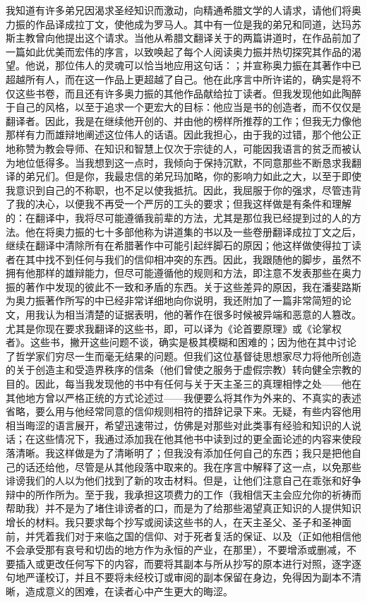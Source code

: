 我知道有许多弟兄因渴求圣经知识而激动，向精通希腊文学的人请求，请他们将奥力振的作品译成拉丁文，使他成为罗马人。其中有一位是我的弟兄和同道，达玛苏斯主教曾向他提出这个请求。当他从希腊文翻译关于的两篇讲道时，在作品前加了一篇如此优美而宏伟的序言，以致唤起了每个人阅读奥力振并热切探究其作品的渴望。他说，那位伟人的灵魂可以恰当地应用这句话：；并宣称奥力振在其著作中已超越所有人，而在这一作品上更超越了自己。他在此序言中所许诺的，确实是将不仅这些书卷，而且还有许多奥力振的其他作品献给拉丁读者。但我发现他如此陶醉于自己的风格，以至于追求一个更宏大的目标：他应当是书的创造者，而不仅仅是翻译者。因此，我是在继续他开创的、并由他的榜样所推荐的工作；但我无力像他那样有力而雄辩地阐述这位伟人的话语。因此我担心，由于我的过错，那个他公正地称赞为教会导师、在知识和智慧上仅次于宗徒的人，可能因我语言的贫乏而被认为地位低得多。当我想到这一点时，我倾向于保持沉默，不同意那些不断恳求我翻译的弟兄们。但是你，我最忠信的弟兄玛加略，你的影响力如此之大，以至于即使我意识到自己的不称职，也不足以使我抵抗。因此，我屈服于你的强求，尽管违背了我的决心，以便我不再受一个严厉的工头的要求；但我这样做是有条件和理解的：在翻译中，我将尽可能遵循我前辈的方法，尤其是那位我已经提到过的人的方法。他在将奥力振的七十多部他称为讲道集的书以及一些卷册翻译成拉丁文之后，继续在翻译中清除所有在希腊著作中可能引起绊脚石的原因；他这样做使得拉丁读者在其中找不到任何与我们的信仰相冲突的东西。因此，我跟随他的脚步，虽然不拥有他那样的雄辩能力，但尽可能遵循他的规则和方法，即注意不发表那些在奥力振的著作中发现的彼此不一致和矛盾的东西。关于这些差异的原因，我在潘斐路斯为奥力振著作所写的中已经非常详细地向你说明，我还附加了一篇非常简短的论文，用我认为相当清楚的证据表明，他的著作在很多时候被异端和恶意的人篡改。尤其是你现在要求我翻译的这些书，即，可以译为《论首要原理》或《论掌权者》。这些书，撇开这些问题不谈，确实是极其模糊和困难的；因为他在其中讨论了哲学家们穷尽一生而毫无结果的问题。但我们这位基督徒思想家尽力将他所创造的关于创造主和受造界秩序的信条（他们曾使之服务于虚假宗教）转向健全宗教的目的。因此，每当我发现他的书中有任何与关于天主圣三的真理相悖之处——他在其他地方曾以严格正统的方式论述过——我便要么将其作为外来的、不真实的表述省略，要么用与他经常同意的信仰规则相符的措辞记录下来。无疑，有些内容他用相当晦涩的语言展开，希望迅速带过，仿佛是对那些对此类事有经验和知识的人说话；在这些情况下，我通过添加我在他其他书中读到过的更全面论述的内容来使段落清晰。我这样做是为了清晰明了；但我没有添加任何自己的东西；我只是把他自己的话还给他，尽管是从其他段落中取来的。我在序言中解释了这一点，以免那些诽谤我们的人以为他们找到了新的攻击材料。但是，让他们注意自己在乖张和好争辩中的所作所为。至于我，我承担这项费力的工作（我相信天主会应允你的祈祷而帮助我）并不是为了堵住诽谤者的口，而是为了给那些渴望真正知识的人提供知识增长的材料。我只要求每个抄写或阅读这些书的人，在天主圣父、圣子和圣神面前，并凭着我们对于来临之国的信仰、对于死者复活的保证、以及（正如他相信他不会承受那有哀号和切齿的地方作为永恒的产业，在那里），不要增添或删减，不要插入或更改任何写下的内容，而要将其副本与所从抄写的原本进行对照，逐字逐句地严谨校订，并且不要将未经校订或审阅的副本保留在身边，免得因为副本不清晰，造成意义的困难，在读者心中产生更大的晦涩。\par

